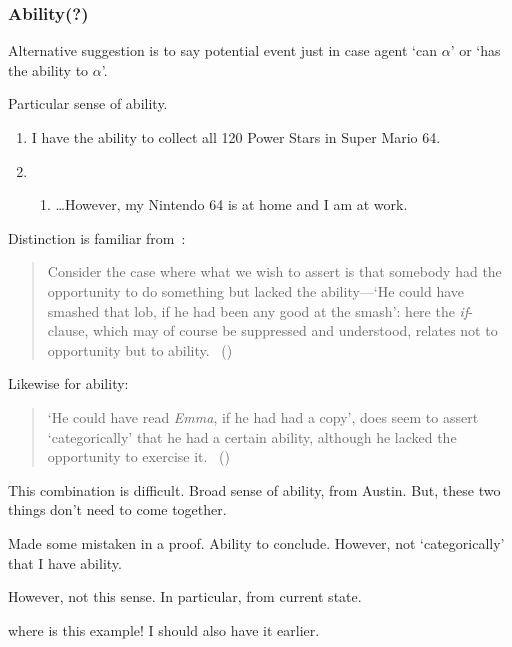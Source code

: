 \subsubsection{Ability(?)}
\label{cha:sec:fcs-def:ability}

\begin{note}
  Alternative suggestion is to say potential event just in case agent `can \(\alpha\)' or `has the ability to \(\alpha\)'.

  Particular sense of ability.

  \begin{enumerate}
  \item
    I have the ability to collect all 120 Power Stars in Super Mario 64.
  \item[]
    \begin{enumerate}
    \item[]
      \dots However, my Nintendo 64 is at home and I am at work.
    \end{enumerate}
  \end{enumerate}

  Distinction is familiar from~\citeauthor{Austin:1961vz}:

  \begin{quote}
    Consider the case where what we wish to assert is that somebody had the opportunity to do something but lacked the ability---`He could have smashed that lob, if he had been any good at the smash':
    here the \emph{if}-clause, which may of course be suppressed and understood, relates not to opportunity but to ability.%
    \mbox{ }\hfill\mbox{(\citeyear[177]{Austin:1961vz})}
  \end{quote}
  Likewise for ability:
  \begin{quote}
    `He could have read \emph{Emma}, if he had had a copy', does seem to assert `categorically' that he had a certain ability, although he lacked the opportunity to exercise it.%
    \mbox{ }\hfill\mbox{(\citeyear[177]{Austin:1961vz})}
  \end{quote}

  This combination is difficult.
  Broad sense of ability, from Austin.
  But, these two things don't need to come together.

  Made some mistaken in a proof.
  Ability to conclude.
  However, not `categorically' that I have ability.


  However, not this sense.
  In particular, \fc{} from current state.

  {
    \color{red} where is this example!
    I should also have it earlier.
  }


\end{note}
